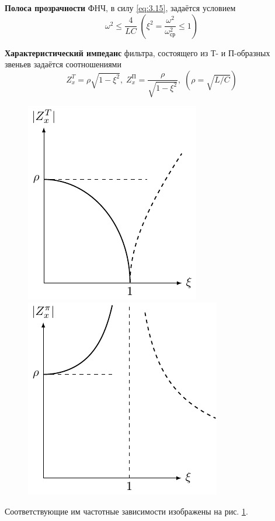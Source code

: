 \textbf{Полоса прозрачности} ФНЧ, в силу \eqref{eq:3.15}, задаётся условием
\begin{equation}
\label{eq:5.1.3}
\omega^2\leq\frac{4}{LC}\; (\xi^2=\frac{\omega^2}{\omega^2_{\text{ср}}}\leq1)
\end{equation}

\textbf{Характеристический импеданс} фильтра, состоящего из Т- и П-образных звеньев задаётся соотношениями
\begin{equation}
	Z^T_x=\rho\sqrt{1-\xi^2},\;
	Z^{\text{П}}_x=\frac{\rho}{\sqrt{1-\xi^2}},\;
	(\rho=\sqrt{L/C})
\end{equation}
\begin{figure}[h!]
\begin{minipage}{0.49\linewidth}
	\centering
	\includegraphics[]{chem/FLF/ZxT.pdf}
\end{minipage}
\begin{minipage}{0.49\linewidth}
	\centering
	\includegraphics[]{chem/FLF/ZxP.pdf}
\end{minipage}
\caption{}
\label{fig:1.3}
\end{figure}
Соответствующие им частотные зависимости изображены на рис. \ref{fig:1.3}.

